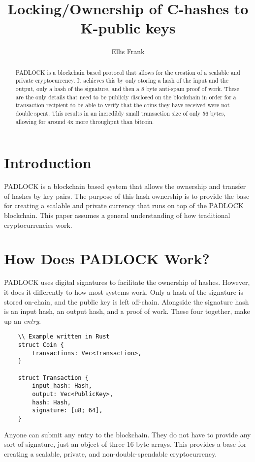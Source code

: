 \documentclass[12pt, letterpaper]{article} \usepackage[utf8]{inputenc}
\title{%
Locking/Ownership of C-hashes to K-public keys } \author{Ellis Frank}
\begin{document}
\maketitle

\begin{abstract} PADLOCK is a blockchain based protocol that allows for the
creation of a scalable and private cryptocurrency. It achieves this by only
storing a hash of the input and the output, only a hash of the signature, and
then a 8 byte anti-spam proof of work. These are the only details that need to
be publicly disclosed on the blockchain in order for a transaction recipient to
be able to verify that the coins they have received were not double spent. This
results in an incredibly small transaction size of only 56 bytes, allowing for
around 4x more throughput than bitcoin. \end{abstract}

\section{Introduction} PADLOCK is a blockchain based system that allows the
ownership and transfer of hashes by key pairs. The purpose of this hash
ownership is to provide the base for creating a scalable and private currency
that runs on top of the PADLOCK blockchain. This paper assumes a general
understanding of how traditional cryptocurrencies work.

\section{How Does PADLOCK Work?} PADLOCK uses digital signatures to facilitate
the ownership of hashes. However, it does it differently to how most systems
work. Only a hash of the signature is stored on-chain, and the public key is
left off-chain. Alongside the signature hash is an input hash, an output hash,
and a proof of work. These four together, make up an \textit{entry}.

\begin{verbatim}
    \\ Example written in Rust
    struct Coin {
    	transactions: Vec<Transaction>,
    }
     
    struct Transaction {
    	input_hash: Hash,
    	output: Vec<PublicKey>,
    	hash: Hash,
    	signature: [u8; 64],
    }
\end{verbatim}

Anyone can submit any entry to the blockchain. They do not have to provide any
sort of signature, just an object of three 16 byte arrays. This provides a base
for creating a scalable, private, and non-double-spendable cryptocurrency.
\end{document}
